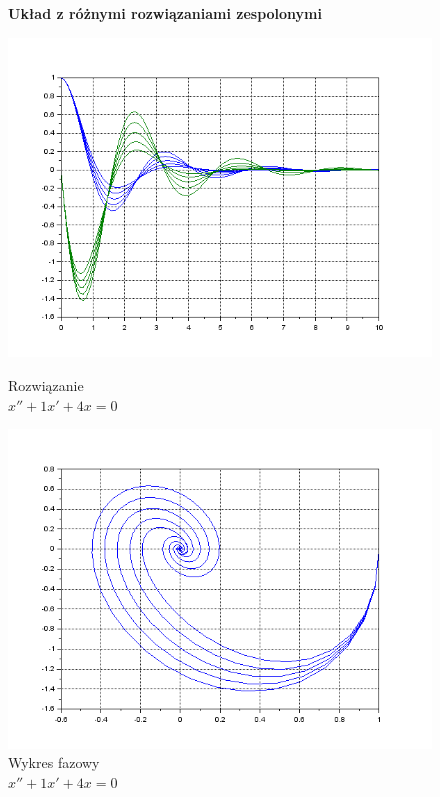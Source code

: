 \documentclass[12pt]{article}
\begin{document}
\begin{figure}[H]
  \centering
  \textbf{Układ z różnymi rozwiązaniami zespolonymi}\par\medskip
  \hspace{-1.6cm}
  \begin{minipage}[b]{0.49\textwidth}
    \includegraphics[scale=0.47]{./img/5-zespolone-xy}
    \caption{Rozwiązanie \\ \centering$x''+1x'+4x=0$}
    \label{5-zespolone-xy}
  \end{minipage}
  \hfill
  \begin{minipage}[b]{0.49\textwidth}
    \includegraphics[scale=0.47]{./img/5-zespolone-phase}
    \caption{Wykres fazowy \\ \centering $x''+1x'+4x=0$}
    \label{5-zespolone-phase}
  \end{minipage}
\end{figure}
\end{document}
